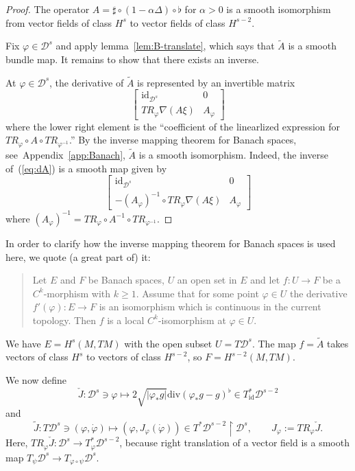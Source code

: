 \documentclass[a5paper,10pt,twoside]{article}
\newcommand{\cD}{\ensuremath{\mathcal{D}}}
\DeclareMathOperator*{\id}{id}
\theoremstyle{plain}
\theoremstyle{definition}
\theoremstyle{remark}
\begin{document}
\begin{proof}
	The operator $A=\sharp\circ(1-\alpha\Delta)\circ \flat$ for $\alpha>0$ is a smooth isomorphism from vector fields of class $H^s$ to vector fields of class $H^{s-2}$.
	
	Fix $\varphi\in\cD^s$ and apply lemma~\ref{lem:B-translate}, which says that $\tilde{A}$ is a smooth bundle map. It remains to show that there exists an inverse.
	
	At $\varphi\in\cD^s$, the derivative of $\tilde{A}$ is represented by an invertible matrix 
	\begin{equation}
	\label{eq:dA}
	\begin{bmatrix}
	  {\id}_{\cD^s} &  0 \\
	  TR_{\varphi}\nabla(A\xi) & A_\varphi 
	\end{bmatrix}
	\end{equation}
	where the lower right element is the ``coefficient of the linearlized expression for $TR_{\varphi}\circ A\circ TR_{\varphi^{-1}}$.'' 
	By the inverse mapping theorem for Banach spaces, see~Appendix~\ref{app:Banach}, $\tilde{A}$ is a smooth isomorphism. Indeed, the inverse of~(\ref{eq:dA}) is a smooth map given by
	\begin{equation}
	\begin{bmatrix}
	{\id}_{\cD^s} &  0 \\
	-(A_\varphi)^{-1}\circ TR_{\varphi}\nabla(A\xi) & A_\varphi 
	\end{bmatrix}
	\end{equation}
	where $(A_\varphi)^{-1}=TR_\varphi\circ A^{-1}\circ TR_{\varphi^{-1}}$.
\end{proof}

In order to clarify how the inverse mapping theorem for Banach spaces is used here, we quote (a great part of) it:
%
\begin{quote}
Let $E$ and $F$ be Banach spaces, $U$ an open set in $E$ and let
$f:U\to F$ be a $C^{k}$-morphism with $k\geq1.$ Assume that for
some point $\varphi\in U$ the derivative $f'(\varphi):E\to F$ is
an isomorphism which is continuous in the current topology. 
Then $f$ is a local $C^{k}$-isomorphism at $\varphi\in U.$
\end{quote}
%
We have $E=H^s(M,TM)$ with the open subset $U=T\cD^s$. The map $f=\tilde{A}$ takes vectors of class $H^s$ to vectors of class $H^{s-2}$, so $F=H^{s-2}(M,TM).$


We now define%
\[
\check{J}: \cD^s\ni\varphi\mapsto 2\sqrt{|\varphi_*g|}\mathrm{div}(\varphi_*g-g)^\flat \in T^*_{\id}\cD^{s-2}
\]
and
\[
\tilde{J}:T\cD^s\ni(\varphi,\dot{\varphi})\mapsto (\varphi,J_\varphi(\dot{\varphi}))\in  T^*\cD^{s-2}\upharpoonright \cD^{s},\qquad J_\varphi:=TR_\varphi \check{J}.
\]
Here, $TR_\varphi \check{J}:\cD^s\to T^*_\varphi \cD^{s-2}$, because right translation of a vector field is a smooth map $T_\psi\cD^s\to T_{\varphi\circ\psi}\cD^s.$ 
\end{document}
